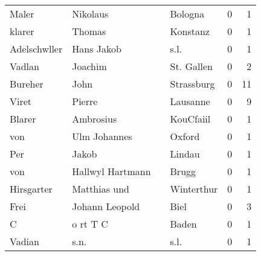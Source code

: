 \begin{tabular}{llllrr}
                    Maler &                           Nikolaus &             &                                     Bologna &          0 &         1 \\
                   klarer &                             Thomas &             &                                    Konstanz &          0 &         1 \\
             Adelschwller &                         Hans Jakob &             &                                        s.l. &          0 &         1 \\
                   Vadlan &                            Joachim &             &                                  St. Gallen &          0 &         2 \\
                  Bureher &                               John &             &                                  Strassburg &          0 &        11 \\
                    Viret &                             Pierre &             &                                    Lausanne &          0 &         9 \\
                   Blarer &                          Ambrosius &             &                                   KouCfaiil &          0 &         1 \\
                      von &                       Ulm Johannes &             &                                      Oxford &          0 &         1 \\
                      Per &                              Jakob &             &                                      Lindau &          0 &         1 \\
                      von &                   Hallwyl Hartmann &             &                                       Brugg &          0 &         1 \\
               Hirsgarter &                       Matthias und &             &                                  Winterthur &          0 &         1 \\
                     Frei &                     Johann Leopold &             &                                        Biel &          0 &         3 \\
                        C &                           o rt T C &             &                                       Baden &          0 &         1 \\
                   Vadian &                               s.n. &             &                                        s.l. &          0 &         1 \\

\end{tabular}
